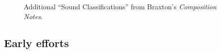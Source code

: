         \begin{figure}
        \centering
        \captionsetup{width=.5\textwidth}
        \caption[Additional ``Sound Classifications'' from Braxton's \textit{Composition Notes}.]{Additional ``Sound Classifications'' from Braxton's \textit{Composition Notes}.\footnotemark}
        \label{fig:soundclassifications}
    \end{figure}


    \subsection{Early efforts}

